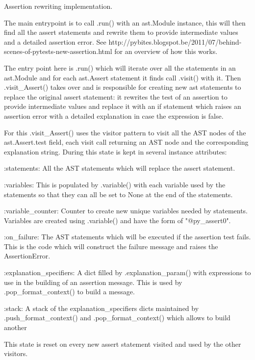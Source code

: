 \begin{DoxyVerb}Assertion rewriting implementation.

The main entrypoint is to call .run() with an ast.Module instance,
this will then find all the assert statements and rewrite them to
provide intermediate values and a detailed assertion error.  See
http://pybites.blogspot.be/2011/07/behind-scenes-of-pytests-new-assertion.html
for an overview of how this works.

The entry point here is .run() which will iterate over all the
statements in an ast.Module and for each ast.Assert statement it
finds call .visit() with it.  Then .visit_Assert() takes over and
is responsible for creating new ast statements to replace the
original assert statement: it rewrites the test of an assertion
to provide intermediate values and replace it with an if statement
which raises an assertion error with a detailed explanation in
case the expression is false.

For this .visit_Assert() uses the visitor pattern to visit all the
AST nodes of the ast.Assert.test field, each visit call returning
an AST node and the corresponding explanation string.  During this
state is kept in several instance attributes:

:statements: All the AST statements which will replace the assert
   statement.

:variables: This is populated by .variable() with each variable
   used by the statements so that they can all be set to None at
   the end of the statements.

:variable_counter: Counter to create new unique variables needed
   by statements.  Variables are created using .variable() and
   have the form of "@py_assert0".

:on_failure: The AST statements which will be executed if the
   assertion test fails.  This is the code which will construct
   the failure message and raises the AssertionError.

:explanation_specifiers: A dict filled by .explanation_param()
   with %
   expressions to use in the building of an assertion message.
   This is used by .pop_format_context() to build a message.

:stack: A stack of the explanation_specifiers dicts maintained by
   .push_format_context() and .pop_format_context() which allows
   to build another %

This state is reset on every new assert statement visited and used
by the other visitors.\end{DoxyVerb}
 

